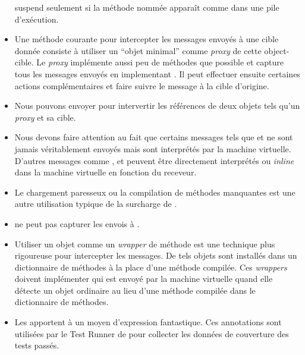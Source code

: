 \documentclass[a4paper,10pt,twoside]{book}
\begin{document}
\begin{itemize}
 suspend seulement si la méthode nommée apparaît comme \sender dans une pile d'exécution.
\item Une méthode courante pour intercepter les messages envoyés à une cible donnée consiste à utiliser un ``objet minimal'' comme \emph{proxy} de cette object-cible. Le \emph{proxy} implémente aussi peu de méthodes que possible et capture tous les messages envoyés en implementant . Il peut effectuer ensuite certaines actions complémentaires et faire suivre le message à la cible d'origine.
\item Nous pouvons envoyer  pour intervertir les références de deux objets tels qu'un \emph{proxy} et sa cible.
\item Nous devons faire attention au fait que certains messages tels que  et  ne sont jamais véritablement envoyés mais sont interprétés par la machine virtuelle. D'autres messages comme \ct{+}, \ct{-} et  peuvent être directement interprétés ou \emph{inline} dans la machine virtuelle en fonction du receveur.
\item Le chargement paresseux ou la compilation de méthodes manquantes est une
autre utilisation typique de la surcharge de .
\item {} ne peut pas capturer les envois à \self.
\item Utiliser un objet comme un \emph{wrapper} de méthode est une technique plus rigoureuse pour intercepter les messages. De tels objets sont installés dans un dictionnaire de méthodes à la place d'une méthode compilée.
Ces \emph{wrappers} doivent implémenter  qui est envoyé par la machine virtuelle quand elle détecte un objet ordinaire au lieu d'une méthode compilée dans le dictionnaire de méthodes. 
\item Les \pragmas apportent à \pharo un moyen d'expression fantastique. Ces annotations sont utilisées par le Test Runner de \sunit pour collecter les données de couverture des tests passés.
\end{itemize}

\ifx\wholebook\relax\else
   
   
\end{document}
